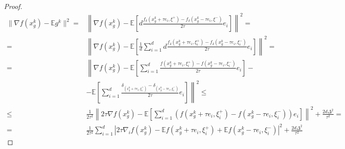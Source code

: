\documentclass{article}
\begin{document}
\begin{proof}
\begin{align*}
    \|\nabla f(x_g^k) - \mathbb{E} g^k\|^2 =& \left\lVert\nabla f(x_g^k) - \mathbb{E}\left[d\frac{f_\delta(x_g^k + \tau e_i, \xi^+) - f_\delta(x_g^k - \tau e_i, \xi^-)}{2\tau} e_i\right]\right\rVert^2 = \\
    =& \left\lVert\nabla f(x_g^k) - \mathbb{E}\left[\frac{1}{d} \sum\limits_{i = 1}^d d\frac{f_\delta(x_g^k + \tau e_i, \xi_i^+) - f_\delta(x_g^k - \tau e_i, \xi_i^-)}{2\tau} e_i\right]\right\rVert^2 = \\
    =& \left\lVert\nabla f(x_g^k) - \mathbb{E}\left[\sum\limits_{i = 1}^d \frac{f(x_g^k + \tau e_i, \xi_i^+) - f(x_g^k - \tau e_i, \xi_i^-)}{2\tau} e_i\right] \right.-\\
    &-\left.\mathbb{E}\left[\sum\limits_{i = 1}^d \frac{\delta_(x_g^k + \tau e_i, \xi_i^+) - \delta_(x_g^k - \tau e_i, \xi_i^-)}{2\tau} e_i\right]\right\rVert^2 \leqslant \\
    \leqslant& \frac{1}{2\tau^2} \left\lVert 2\tau \nabla f(x_g^k) - \mathbb{E}\left[\sum\limits_{i = 1}^d (f(x_g^k + \tau e_i, \xi_i^+) - f(x_g^k - \tau e_i, \xi_i^-)) e_i\right]\right\rVert^2 + \frac{2d \Delta^2}{\tau^2} = \\
    =& \frac{1}{2\tau^2} \sum\limits_{i = 1}^d \left| 2\tau \nabla_i f(x_g^k) - \mathbb{E}f(x_g^k + \tau e_i, \xi_i^+) + \mathbb{E} f(x_g^k - \tau e_i, \xi_i^-)\right|^2 + \frac{2d \Delta^2}{\tau^2}
\end{align*}


\end{proof}
\end{document}
